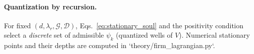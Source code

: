 \paragraph{Quantization by recursion.}
For fixed $(d,\lambda_r,\mathcal G,\mathcal D)$, Eqs.~\eqref{eq:stationary_soul} and the positivity
condition select a \emph{discrete} set of admissible $\psi_k$ (quantized wells of $V$).
Numerical stationary points and their depths are computed in `theory/firm_lagrangian.py`.


